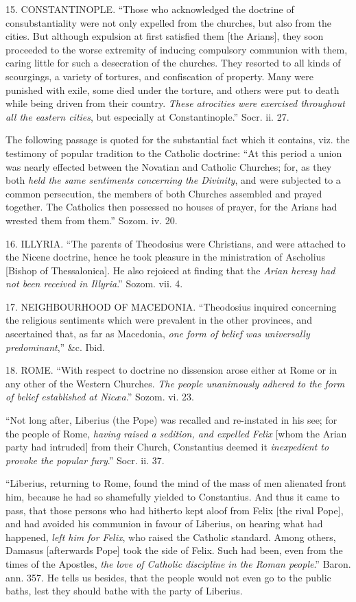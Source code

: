 15. CONSTANTINOPLE.
``Those who acknowledged the doctrine of consubstantiality were not only
expelled from the churches, but also from the cities. But although
expulsion at first satisfied them [the Arians], they soon proceeded to
the worse extremity of inducing compulsory communion with them, caring
little for such a desecration of the churches. They resorted to all
kinds of scourgings, a variety of tortures, and confiscation of
property. Many were punished with exile, some died under the torture,
and others were put to death while being driven from their country. \emph{These
atrocities were exercised throughout all the eastern cities}, but
especially at Constantinople.'' Socr. ii. 27.

The following passage is quoted for the substantial
fact which it contains, viz. the testimony of popular tradition to the
Catholic doctrine: ``At this period a union was nearly effected between
the Novatian and Catholic Churches; for, as they both \emph{held the same
sentiments concerning the Divinity}, and were subjected to a common
persecution, the members of both Churches assembled and prayed together.
The Catholics then possessed no houses of prayer, for the Arians had
wrested them from them.'' Sozom. iv. 20.

16. ILLYRIA.
``The parents of Theodosius were Christians, and were attached to the
Nicene doctrine, hence he took pleasure in the ministration of Ascholius
[Bishop of Thessalonica]. He also rejoiced at finding that the \emph{Arian
heresy had not been received in Illyria}.'' Sozom. vii. 4.

17. NEIGHBOURHOOD
OF MACEDONIA.
``Theodosius inquired concerning the religious sentiments which were
prevalent in the other provinces, and ascertained that, as far as
Macedonia, \emph{one form of belief was universally predominant},''
\&c. Ibid.

18. ROME.
``With respect to doctrine no dissension arose either at Rome or in any
other of the Western Churches. \emph{The people unanimously adhered to the
form of belief established at Nicæa}.'' Sozom. vi. 23.

``Not long after, Liberius (the Pope) was recalled
and re-instated in his see; for the people of Rome, \emph{having raised a
sedition, and expelled Felix} [whom the Arian party had intruded]
from their Church, Constantius deemed it \emph{inexpedient to provoke the
popular fury}.'' Socr. ii. 37.

``Liberius, returning to Rome, found the mind of the
mass of men alienated front him, because he had so shamefully yielded to
Constantius. And thus it came to pass, that those persons who had
hitherto kept aloof from Felix [the rival Pope], and had avoided his
communion in favour of Liberius, on hearing what had happened, \emph{left
him for Felix}, who raised the Catholic standard. Among others,
Damasus [afterwards Pope] took the side of Felix. Such had been, even
from the times of the Apostles, \emph{the love of Catholic discipline in
the Roman people}.'' Baron. ann. 357. He tells us besides, that the
people would not even go to the public baths, lest they should bathe
with the party of Liberius.

